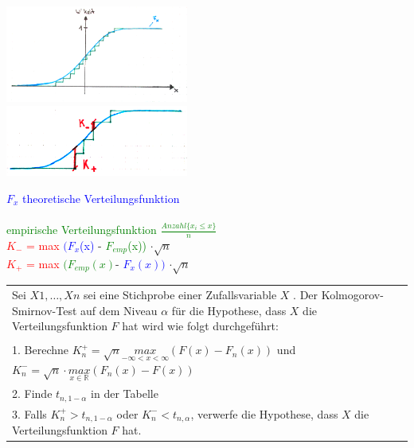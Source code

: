 	\begin{minipage}{6cm}
    \includegraphics[width=6cm]{./bilder/ks1.png}\\
    \includegraphics[width=6cm]{./bilder/ks2.png}\\
    \end{minipage}
	\begin{minipage}{12cm}
    \textcolor{blue}{$F_x$ theoretische Verteilungsfunktion}\\ \\
    \vspace{15mm}
    \textcolor{green}{empirische Verteilungsfunktion $\frac{Anzahl\{x_i \leq
    x \}}{n}$}\\

    \textcolor{red}{$K_-$ = max}
    \textcolor{blue}{$(F_x$(x)} -
    \textcolor{green}{$F_{emp}$(x))} 
    $\cdot\sqrt{n}$ \\
    \textcolor{red}{$K_{+}$ = max} 
    \textcolor{green}{$(F_{emp}(x)$}-
    \textcolor{blue}{$F_x(x))$}
    $\cdot\sqrt{n}$ \\

    \end{minipage}

	\begin{tabular}{p{18cm}}
		Sei $X1,\ldots,Xn$ sei eine Stichprobe einer Zufallsvariable $X$ . Der
		Kolmogorov- Smirnov-Test auf dem Niveau $\alpha$ für die Hypothese, 
		dass $X$ die Verteilungsfunktion $F$ hat wird wie folgt durchgeführt: \\ \\
		1. Berechne 
		$K_n^+ = \sqrt{n} \underset{-\infty<x<\infty}{max}(F(x)-F_n(x))$ und
		$K_n^- = \sqrt{n} \cdot \underset{x \in \mathbb{R}}{max}(F_n(x)-F(x))$  \\
		2. Finde $t_{n,1-\alpha}$ in der Tabelle\\ 
		3. Falls $K^+_n > t_{n,1-\alpha}$ oder $K^-_n < t_{n,\alpha}$,
		verwerfe die Hypothese, dass $X$ die Verteilungsfunktion $F$ hat. 
	\end{tabular}

